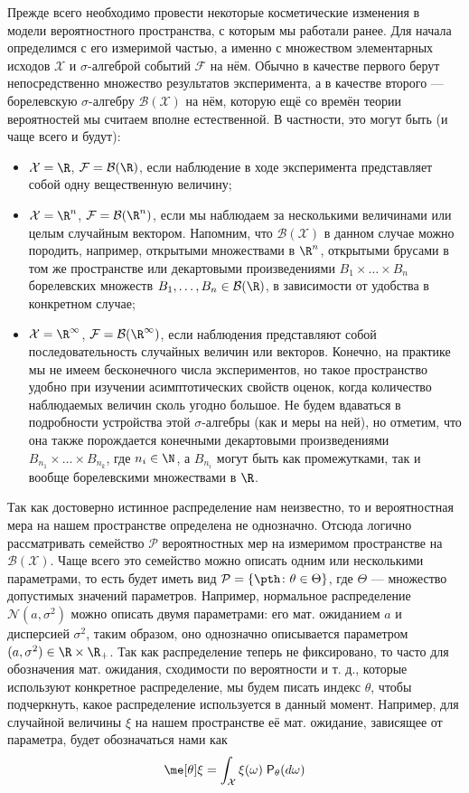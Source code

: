 Прежде всего необходимо провести некоторые косметические изменения в модели вероятностного пространства, с которым мы работали ранее. Для начала определимся с его измеримой частью, а именно с множеством элементарных исходов $\mathcal{X}$ и $\sigma$-алгеброй событий $\mathcal{F}$ на нём. Обычно в качестве первого берут непосредственно множество результатов эксперимента, а в качестве второго --- борелевскую $\sigma$-алгебру $\mathcal{B}(\mathcal{X})$ на нём, которую ещё со времён теории вероятностей мы считаем вполне естественной. В частности, это могут быть (и чаще всего и будут):
\begin{itemize}
    \item $\mathcal{X} = \R$, $\mathcal{F} = \mathcal{B}(\R)$, если наблюдение в ходе эксперимента представляет собой одну вещественную величину;
    \item $\mathcal{X} = \R^n$, $\mathcal{F} = \mathcal{B}(\R^n)$, если мы наблюдаем за несколькими величинами или целым случайным вектором. Напомним, что $\mathcal{B}(\mathcal{X})$ в данном случае можно породить, например, открытыми множествами в $\R^n$, открытыми брусами в том же пространстве или декартовыми произведениями $B_1 \times \ldots \times B_n$ борелевских множеств $B_1, \ldots, B_n \in \mathcal{B}(\R)$, в зависимости от удобства в конкретном случае;
    \item $\mathcal{X} = \R^{\infty}$, $\mathcal{F} = \mathcal{B}(\R^{\infty})$, если наблюдения представляют собой последовательность случайных величин или векторов. Конечно, на практике мы не имеем бесконечного числа экспериментов, но такое пространство удобно при изучении асимптотических свойств оценок, когда количество наблюдаемых величин сколь угодно большое. Не будем вдаваться в подробности устройства этой $\sigma$-алгебры (как и меры на ней), но отметим, что она также порождается конечными декартовыми произведениями $B_{n_1} \times \ldots \times B_{n_k}$, где $n_i \in \N$, а $B_{n_i}$ могут быть как промежутками, так и вообще борелевскими множествами в $\R$.
\end{itemize}

Так как достоверно истинное распределение нам неизвестно, то и вероятностная мера на нашем пространстве определена не однозначно. Отсюда логично рассматривать семейство $\mathcal{P}$ вероятностных мер на измеримом пространстве на $\mathcal{B}(\mathcal{X})$. Чаще всего это семейство можно описать одним или несколькими параметрами, то есть будет иметь вид $\mathcal{P} = \{\pth\colon \theta \in \Theta\}$, где $\Theta$ --- множество допустимых значений параметров. Например, нормальное распределение $\mathcal{N}(a, \sigma^2)$ можно описать двумя параметрами: его мат. ожиданием $a$ и дисперсией $\sigma^2$, таким образом, оно однозначно описывается параметром $(a, \sigma^2) \in \R \times \R_+$. Так как распределение теперь не фиксировано, то часто для обозначения мат. ожидания, сходимости по вероятности и т. д., которые используют конкретное распределение, мы будем писать индекс $\theta$, чтобы подчеркнуть, какое распределение используется в данный момент. Например, для случайной величины $\xi$ на нашем пространстве её мат. ожидание, зависящее от параметра, будет обозначаться нами как
\[
\me[\theta] \xi = \int_{\mathcal X} \xi(\omega) \;\mathsf{P}_{\theta} (d\omega)
\]

